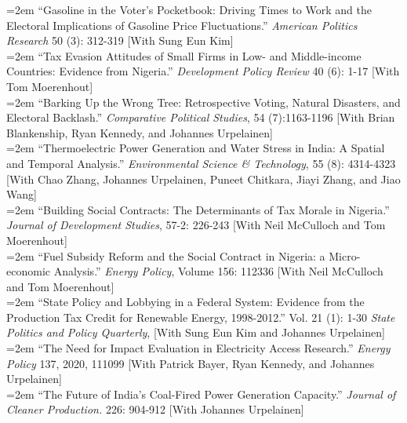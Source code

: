 \hangindent=2em 
 ``Gasoline in the Voter’s Pocketbook: Driving Times to Work and the Electoral Implications of Gasoline Price Fluctuations.'' \textit{American Politics Research} 50 (3): 312-319 [With Sung Eun Kim]\\

\hangindent=2em 
 ``Tax Evasion Attitudes of Small Firms in Low- and Middle-income Countries: Evidence from Nigeria.'' \textit{Development Policy Review} 40 (6): 1-17 [With Tom Moerenhout]\\


\hangindent=2em 
 ``Barking Up the Wrong Tree: Retrospective Voting, Natural Disasters, and Electoral Backlash.'' \textit{Comparative Political Studies}, 54 (7):1163-1196 [With Brian Blankenship, Ryan Kennedy, and Johannes Urpelainen] \\

\hangindent=2em 
 ``Thermoelectric Power Generation and Water Stress in India: A Spatial and Temporal Analysis.'' \textit{Environmental Science \& Technology}, 55 (8): 4314-4323 [With Chao Zhang, Johannes Urpelainen, Puneet Chitkara, Jiayi Zhang, and Jiao Wang]\\


\hangindent=2em 
``Building Social Contracts: The Determinants of Tax Morale in Nigeria.'' \textit{Journal of Development Studies}, 57-2: 226-243 [With Neil McCulloch and Tom Moerenhout] \\

\hangindent=2em 
 ``Fuel Subsidy Reform and the Social Contract in Nigeria: a Micro-economic Analysis.'' \textit{Energy Policy}, Volume 156: 112336 [With Neil McCulloch and Tom Moerenhout]\\


\hangindent=2em
``State Policy and Lobbying in a Federal System: Evidence from the Production Tax Credit for Renewable Energy, 1998-2012.'' Vol. 21 (1): 1-30 \textit{State Politics and Policy Quarterly}, [With Sung Eun Kim and Johannes Urpelainen] \\

\hangindent=2em 
 ``The Need for Impact Evaluation in Electricity Access Research.'' \textit{Energy Policy} 137, 2020, 111099 [With Patrick Bayer, Ryan Kennedy, and Johannes Urpelainen] \\

\hangindent=2em
 ``The Future of India’s Coal-Fired Power Generation Capacity.'' {\it Journal of Cleaner Production.} 226: 904-912 [With Johannes Urpelainen] \\

